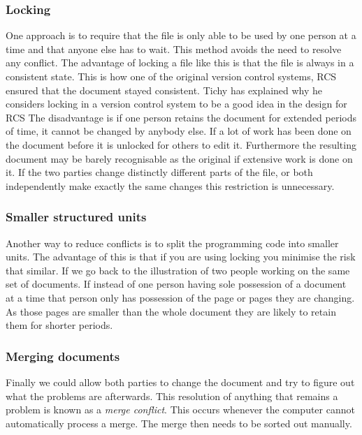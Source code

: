\subsubsection{Locking}
One approach is to require that the file is only able to be used by one person at a time and that anyone else has to wait. This method avoids the need to resolve any conflict.  The advantage of locking a file like this is that the file is always in a consistent state. This is how one of the original version control systems, RCS ensured that the document stayed consistent. Tichy has explained why he considers locking in a version control system to be a good idea in the design for RCS\cite{Tichy1982} The disadvantage is if one person retains the document for extended periods of time, it cannot be changed by anybody else. If a lot of work has been done on the document before it is unlocked for others to edit it. Furthermore the resulting document may be barely recognisable as the original if extensive work is done on it. If the two parties change distinctly different parts of the file, or both independently make exactly the same changes this restriction is unnecessary. 
\subsubsection{Smaller structured units}
Another way to reduce conflicts is to split the programming code into smaller units.  The advantage of this is that if you are using locking you minimise the risk that similar. If we go back to the illustration of two people working on the same set of documents.  If instead of one person having sole possession of a document at a time that person only has possession of the page or pages they are changing. As those pages are smaller than the whole document they are likely to retain them for shorter periods.
\subsubsection{Merging documents}
Finally we could allow both parties to change the document and try to figure out what the problems are afterwards.  This resolution of anything that remains a problem is known as a \emph{merge conflict}. This occurs whenever the computer cannot automatically process a merge.  The merge then needs to be sorted out manually.

